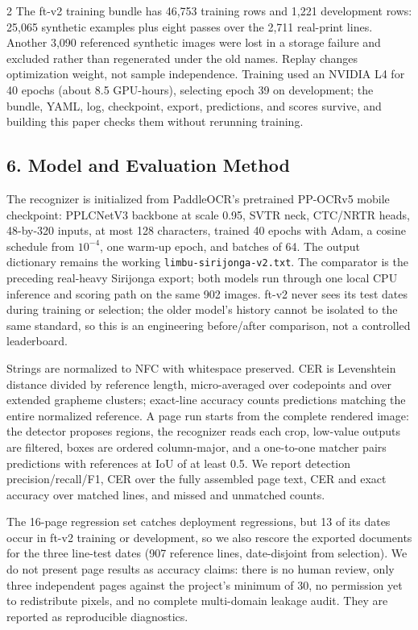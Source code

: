 \documentclass[
  10pt,
]{article}
\begin{document}
\begin{multicols}{2}
The ft-v2 training bundle has 46,753 training rows and 1,221 development
rows: 25,065 synthetic examples plus eight passes over the 2,711
real-print lines. Another 3,090 referenced synthetic images were lost in
a storage failure and excluded rather than regenerated under the old
names. Replay changes optimization weight, not sample independence.
Training used an NVIDIA L4 for 40 epochs (about 8.5 GPU-hours),
selecting epoch 39 on development; the bundle, YAML, log, checkpoint,
export, predictions, and scores survive, and building this paper checks
them without rerunning training.

\subsection{6. Model and Evaluation
Method}\label{model-and-evaluation-method}

The recognizer is initialized from PaddleOCR's pretrained PP-OCRv5
mobile checkpoint: PPLCNetV3 backbone at scale 0.95, SVTR neck, CTC/NRTR
heads, 48-by-320 inputs, at most 128 characters, trained 40 epochs with
Adam, a cosine schedule from \(10^{-4}\), one warm-up epoch, and batches
of 64. The output dictionary remains the working
\texttt{limbu-sirijonga-v2.txt}. The comparator is the preceding
real-heavy Sirijonga export; both models run through one local CPU
inference and scoring path on the same 902 images. ft-v2 never sees its
test dates during training or selection; the older model's history
cannot be isolated to the same standard, so this is an engineering
before/after comparison, not a controlled leaderboard.

Strings are normalized to NFC with whitespace preserved. CER is
Levenshtein distance divided by reference length, micro-averaged over
codepoints and over extended grapheme clusters; exact-line accuracy
counts predictions matching the entire normalized reference. A page run
starts from the complete rendered image: the detector proposes regions,
the recognizer reads each crop, low-value outputs are filtered, boxes
are ordered column-major, and a one-to-one matcher pairs predictions
with references at IoU of at least 0.5. We report detection
precision/recall/F1, CER over the fully assembled page text, CER and
exact accuracy over matched lines, and missed and unmatched counts.

The 16-page regression set catches deployment regressions, but 13 of its
dates occur in ft-v2 training or development, so we also rescore the
exported documents for the three line-test dates (907 reference lines,
date-disjoint from selection). We do not present page results as
accuracy claims: there is no human review, only three independent pages
against the project's minimum of 30, no permission yet to redistribute
pixels, and no complete multi-domain leakage audit. They are reported as
reproducible diagnostics.


\end{multicols}
\end{document}
